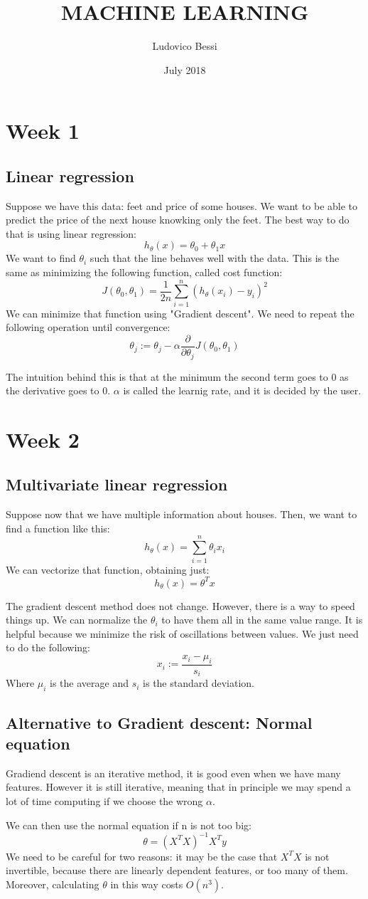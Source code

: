 \documentclass{article}
\title{\LARGE MACHINE LEARNING}
\author{Ludovico Bessi}
\date{July 2018}
\begin{document}
\maketitle
\tableofcontents
\section{Week 1}
\subsection{Linear regression}
Suppose we have this data: feet and price of some houses. We want to be able to
predict the price of the next house knowking only the feet. The best way to do
that is using linear regression: $$ h_\theta(x) = \theta_0 + \theta_1 x $$
We want to find $\theta_i$ such that the line behaves well with the data.
This is the same as minimizing the following function, called cost function:
$$ J(\theta_0,\theta_1) = \frac{1}{2n}\sum_{i=1}^{n}(h_\theta(x_i) - y_i)^2$$
We can minimize that function using "Gradient descent".
We need to repeat the following operation until convergence:
$$ \theta_j := \theta_j -\alpha \frac{\partial}{\partial \theta_j}
J(\theta_0,\theta_1)$$

The intuition behind this is that at the minimum the second term goes to 0 as
the derivative goes to 0. $\alpha$ is called the learnig rate, and it is decided
by the user.
\newpage


\section{Week 2}
\subsection{Multivariate linear regression}
Suppose now that we have multiple information about houses.
Then, we want to find a function like this:
$$ h_\theta(x) = \sum_{i=1}^{n} \theta_i x_i $$
We can vectorize that function, obtaining just:
$$ h_\theta(x) = \theta^T x $$

The gradient descent method does not change. However, there is a way to speed
things up. We can normalize the $\theta_i$ to have them all in the same value
range. It is helpful because we minimize the risk of oscillations between values.
We just need to do the following:
$$ x_i := \frac{x_i - \mu_i}{s_i} $$
Where $\mu_i$ is the average and $s_i$ is the standard deviation.

\subsection{Alternative to Gradient descent: Normal equation}
Gradiend descent is an iterative method, it is good even when we have many features.
However it is still iterative, meaning that in principle we may spend a lot of time
computing if we choose the wrong $\alpha$.

We can then use the normal equation if n is not too big:
$$ \theta = (X^T X )^{-1} X^T y $$
We need to be careful for two reasons: it may be the case that $X^T X$ is not
invertible, because there are linearly dependent features, or too many of them.
Moreover, calculating $\theta$ in this way costs $O(n^3)$.  
\end{document}
